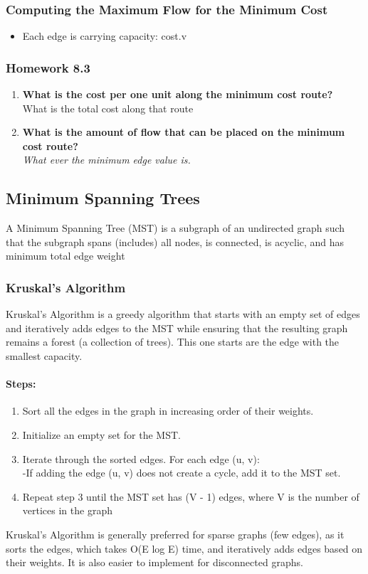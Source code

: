 \documentclass[10pt]{article}
\begin{document}
\subsubsection{Computing the Maximum Flow for the Minimum Cost}
\begin{itemize}
    \item Each edge is carrying capacity: cost.v
\end{itemize}
\subsubsection{Homework 8.3}
\begin{enumerate}
    \item \textbf{What is the cost per one unit along the minimum cost route?}
          \\ What is the total cost along that route
    \item \textbf{What is the amount of flow that can be placed on the minimum cost route?} \\\textit{What ever the minimum edge value is. }
\end{enumerate}

\subsection{Minimum Spanning Trees}
A Minimum Spanning Tree (MST) is a subgraph of an undirected graph such that the subgraph spans (includes) all nodes, is connected, is acyclic, and has minimum total edge weight\\
\subsubsection{Kruskal's Algorithm}
Kruskal's Algorithm is a greedy algorithm that starts with an empty set of edges and iteratively adds edges to the MST while ensuring that the resulting graph remains a forest (a collection of trees). This one starts are the edge with the smallest capacity.
\paragraph{Steps:}
\begin{enumerate}
    \item Sort all the edges in the graph in increasing order of their weights.
    \item Initialize an empty set for the MST.
    \item Iterate through the sorted edges. For each edge (u, v):
          \\-If adding the edge (u, v) does not create a cycle, add it to the MST set.
    \item Repeat step 3 until the MST set has (V - 1) edges, where V is the number of vertices in the graph
\end{enumerate}
Kruskal's Algorithm is generally preferred for sparse graphs (few edges), as it sorts the edges, which takes O(E log E) time, and iteratively adds edges based on their weights. It is also easier to implement for disconnected graphs.
\end{document}
